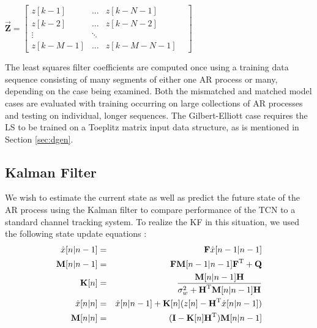\documentclass[twocolumn,letterpaper]{IEEEAerospaceCLS}  %
\begin{document}
$\vec{\textbf{Z}} = \begin{bmatrix}
   z[k-1]   & ...       & z[k-N-1]     & \\
   z[k-2]   & ...       & z[k-N-2]     & \\
   \vdots             &  \ddots   &              & \\
   z[k-M-1] & ...       & z[k-M-N-1]  
\end{bmatrix}$

The least squares filter coefficients are computed once using a training data sequence consisting of many segments of either one AR process or many, depending on the case being examined. Both the mismatched and matched model cases are evaluated with training occurring on large collections of AR processes and testing on individual, longer sequences. The Gilbert-Elliott case requires the LS to be trained on a Toeplitz matrix input data structure, as is mentioned in Section \ref{sec:dgen}.
 

\subsection{Kalman Filter}

 We wish to estimate the current state as well as predict the future state of the AR process using the Kalman filter to compare performance of the TCN to a standard channel tracking system. To realize the KF in this situation, we used the following state update equations \cite{kay1993fundamentals}: \\
\begin{eqnarray*}
\hat{x}[n|n-1]&=&\textbf{F}\hat{x}[n-1|n-1] \\
\textbf{M}[n|n-1]&=&\textbf{FM}[n-1|n-1]\textbf{F}^{\rm T} + \textbf{Q} \\
\textbf{K}[n]&=&\frac{\textbf{M}[n|n-1]\textbf{H}}{\sigma_{w}^{2} + \textbf{H}^{\rm T}\textbf{M}[n|n-1]\textbf{H}} \\
\hat{x}[n|n]&=&\hat{x}[n|n-1] + \textbf{K}[n](z[n]-\textbf{H}^{\rm T}\hat{x}[n|n-1]) \\
\textbf{M}[n|n]&=&(\textbf{I}-\textbf{K}[n]\textbf{H}^{\rm T})\textbf{M}[n|n-1]
\end{eqnarray*}
\end{document}
